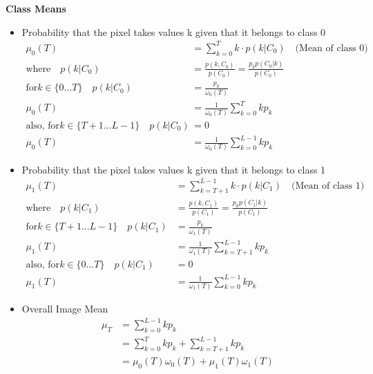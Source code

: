 \noindent \textbf{Class Means} 
\begin{itemize}
  

\item  Probability that the pixel takes values k given that it belongs to class 0
\begin{align*}
\mu_0(T) &= \sum_{k=0}^T k \cdot p(k | C_0)  \quad\text{(Mean of class 0)} \\
\text{where} \quad p(k | C_0) &= \frac{p(k, C_0)}{p(C_0)} = \frac{p_k p(C_0 | k)}{p(C_0)} \\
\text{for} k \in \{ 0\dots T \} \quad p(k | C_0) &= \frac{p_k}{\omega_0(T)} \\
\mu_0(T) &=\frac{1}{\omega_0(T)} \sum_{k=0}^T k p_k \\
\text{also, for} k \in \{ T+1 \dots L-1 \} \quad p(k | C_0) &= 0\\ 
\mu_0(T) &=\frac{1}{\omega_0(T)} \sum_{k=0}^{L-1} k p_k
\end{align*}
\item Probability that the pixel takes values k given that it belongs to class 1
\begin{align*}
\mu_1(T) &= \sum_{k=T+1}^{L-1} k \cdot p(k | C_1)  \quad\text{(Mean of class 1)} \\
\text{where} \quad p(k | C_1) &= \frac{p(k, C_1)}{p(C_1)} = \frac{p_k p(C_1 | k)}{p(C_1)} \\
\text{for} k \in \{ T+1 \dots L-1 \} \quad p(k | C_1) &= \frac{p_k}{\omega_1(T)} \\
\mu_1(T) &=\frac{1}{\omega_1(T)} \sum_{k=T+1}^{L-1} k p_k \\
\text{also, for} k \in \{ 0 \dots T \} \quad p(k | C_1) &= 0\\
\mu_1(T) &=\frac{1}{\omega_1(T)} \sum_{k=0}^{L-1} k p_k
\end{align*}

\item Overall Image Mean
\begin{align*}
\mu_T &= \sum_{k=0}^{L-1} k p_k \\
&= \sum_{k=0}^{T} k p_k + \sum_{k=T+1}^{L-1} k p_k\\ 
&= \mu_0(T) \omega_0(T) + \mu_1(T) \omega_1(T)
\end{align*}
\end{itemize}

